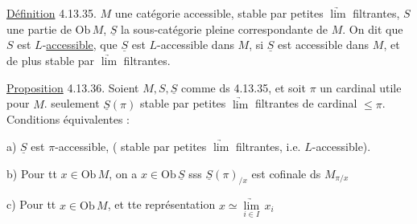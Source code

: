 \uline{Définition} 4.13.35.  $M$ une catégorie accessible, stable par petites $\underrightarrow{\lim}$ filtrantes,  $S$ une partie de $\mathrm{Ob}\,M$, $\underline S$ la sous-catégorie  pleine correspondante de $M$. On dit que $S$ est $L$-\uline{accessible},  que $\underline S$ est $L$-accessible dans $M$, si $\underline S$ est accessible dans $M$, et de plus stable par  $\underrightarrow{\lim}$ filtrantes.


\uline{Proposition} 4.13.36. Soient $M,S,\underline S$ comme ds 4.13.35, et soit $\pi$ un cardinal utile pour $M$.    seulement $\underline S(\pi)$  stable par petites $\underrightarrow{\lim}$ filtrantes  de cardinal $\leq\pi$. Conditions équivalentes :

a) $\underline S$ est $\pi$-accessible,   ( stable par petites $\underrightarrow{\lim}$ filtrantes, i.e. $L$-accessible).


b)  Pour tt $x\in\mathrm{Ob}\,M$, on a $x\in\mathrm{Ob}\,\underline S$ sss $\underline S(\pi)_{/x}$ est cofinale ds $M_{\pi/x}$

c)  Pour tt $x\in\mathrm{Ob}\,M$, et tte représentation $x\simeq\underset{i\in I}{\underrightarrow{\lim}}\,x_i$
